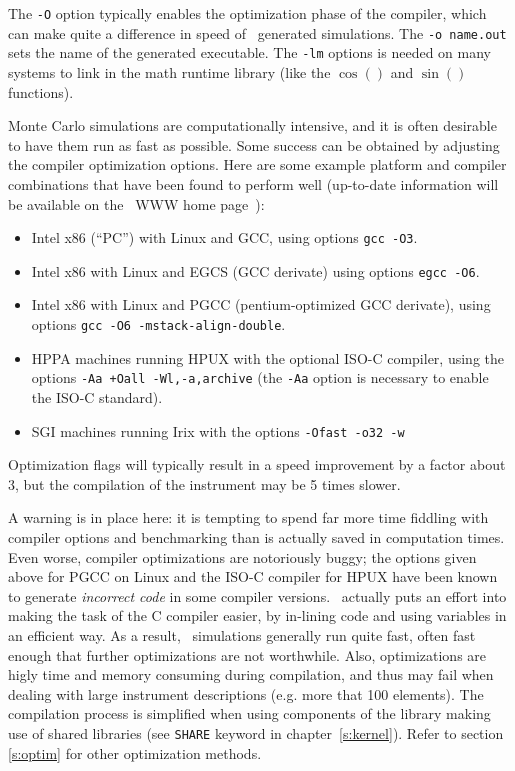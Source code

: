The \verb+-O+ option typically enables the optimization phase of the compiler,
which can make quite a difference in speed of \MCX\ generated simulations. The
\verb+-o name.out+ sets the name of the generated executable. The \verb+-lm+
options is needed on many systems to link in the math runtime library (like the
$\cos()$ and $\sin()$ functions). 

Monte Carlo simulations are computationally intensive, and it is
often desirable to have them run as fast as possible. Some success can
be obtained by adjusting the compiler optimization
options. Here are some example platform and compiler combinations that
have been found to perform well (up-to-date information will be
available on the \MCX\ WWW home page~\cite{mcxtrace_webpage}):
\begin{itemize}
\item Intel x86 (``PC'') with Linux and GCC, using options \verb+gcc -O3+.
\item Intel x86 with Linux and EGCS (GCC derivate) using
  options \verb+egcc -O6+.
\item Intel x86 with Linux and PGCC (pentium-optimized GCC derivate), using
  options \verb+gcc -O6 -mstack-align-double+.
\item HPPA machines running HPUX with the optional ISO-C compiler,
  using the options
  \verb|-Aa +Oall -Wl,-a,archive| (the \verb+-Aa+ option is necessary to
  enable the ISO-C standard).
\item SGI machines running Irix with the options
  \verb|-Ofast -o32 -w|
\end{itemize}
Optimization flags will typically result in a speed improvement by a factor
about 3, but the compilation of the instrument may be 5 times slower.

A warning is in place here: it is tempting to spend far more time
fiddling with compiler options and benchmarking than is actually saved
in computation times. Even worse, compiler optimizations are notoriously
buggy; the options given above for PGCC on Linux and the ISO-C compiler
for HPUX have been known to generate \emph{incorrect code} in some
compiler versions. \MCX\ actually puts an effort into making the task of the C compiler
easier, by in-lining code and using variables in an efficient way. As a
result, \MCX\ simulations generally run quite fast, often fast enough
that further optimizations are not worthwhile. Also, optimizations are higly
time and memory consuming during compilation, and thus may fail when dealing
with large instrument descriptions (e.g. more that 100 elements). The compilation process is simplified when using components of the library making use of shared libraries (see \verb+SHARE+ keyword in chapter~\ref{s:kernel}). Refer to section \ref{s:optim} for other optimization methods.


